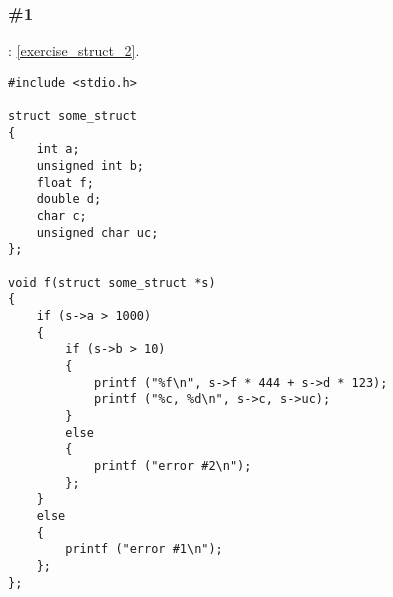 \subsubsection{\Exercise \#1}
\label{exercise_solutions_struct_2}

\Exercise: \ref{exercise_struct_2}.


\begin{lstlisting}
#include <stdio.h>

struct some_struct
{
	int a;
	unsigned int b;
	float f;
	double d;
	char c;
	unsigned char uc;
};

void f(struct some_struct *s)
{
	if (s->a > 1000)
	{
		if (s->b > 10)
		{
			printf ("%f\n", s->f * 444 + s->d * 123);
			printf ("%c, %d\n", s->c, s->uc);
		}
		else
		{
			printf ("error #2\n");
		};
	}
	else
	{
		printf ("error #1\n");
	};
};
\end{lstlisting}